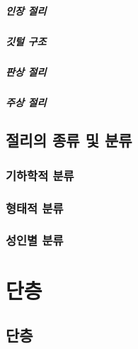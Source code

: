 \documentclass[12pt, a4paper, oneside]{book}
\begin{document}
	\paragraph{인장 절리}
	


	\paragraph{깃털 구조}
	
	
	\paragraph{판상 절리}


	
	\paragraph{주상 절리}
	
	





	\clearpage
	\section{절리의 종류 및 분류}
	
	\subsection{기하학적 분류}
	
	\subsection{형태적 분류}
	
	\subsection{성인별 분류}
	
	
	
	
	
	
	\clearpage
	\chapter{단층}


	\clearpage
	\section{단층}
\end{document}
